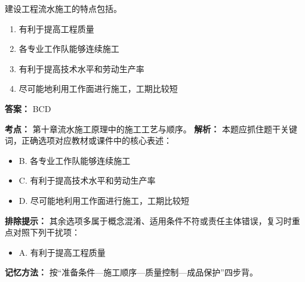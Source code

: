 \documentclass[UTF8,fontset=fandol,11pt]{ctexart}
\begin{document}
\begin{quizbox}[title={第 17 题}]
建设工程流水施工的特点包括。\\
\begin{enumerate}[label=\Alph*.]
\item 有利于提高工程质量
\item 各专业工作队能够连续施工
\item 有利于提高技术水平和劳动生产率
\item 尽可能地利用工作面进行施工，工期比较短
\end{enumerate}
\textbf{答案：} BCD
\vspace{0.25em}
\begin{answerbox}[title={考点解析}]
\textbf{考点：} 第十章流水施工原理中的施工工艺与顺序。
\textbf{解析：} 本题应抓住题干关键词，正确选项对应教材或课件中的核心表述：
\begin{itemize}
\item B. 各专业工作队能够连续施工
\item C. 有利于提高技术水平和劳动生产率
\item D. 尽可能地利用工作面进行施工，工期比较短
\end{itemize}
\textbf{排除提示：} 其余选项多属于概念混淆、适用条件不符或责任主体错误，复习时重点对照下列干扰项：
\begin{itemize}
\item A. 有利于提高工程质量
\end{itemize}
\textbf{记忆方法：} 按“准备条件—施工顺序—质量控制—成品保护”四步背。
\end{answerbox}
\end{quizbox}

\vspace{0.2em}
\end{document}
